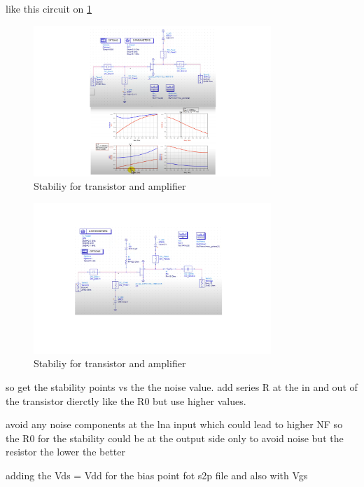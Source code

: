 \documentclass{article}
\begin{document}
\begin{itemize}
     like this circuit on \cref{stability00}
     \begin{figure}[H]
        \centering
        \includegraphics[width=0.8\textwidth]{figures/stability00.pdf}
        \caption{Stabiliy for transistor and amplifier}
        \label{stability00}
    \end{figure}
    \begin{figure}[H]
        \centering
        \includegraphics[width=0.8\textwidth]{figures/stability01.pdf}
        \caption{Stabiliy for transistor and amplifier}
        \label{stability01}
    \end{figure}


    so get the stability points vs the the noise value. add series R at the in and out of the transistor dierctly like the R0 but use higher values.

    avoid any noise components at the lna input which could lead to higher NF so the R0 for the stability could be at the output side only to avoid noise but the resistor the lower the better 

    adding the Vds = Vdd for the bias point fot s2p file and also with  Vgs 


\end{itemize}
\end{document}
